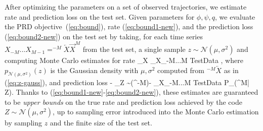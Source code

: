 \documentclass[entropy,article,submit,moreauthors,pdftex,10pt,a4paper]{Definitions/mdpi}
\newcommand{\finitefuture}{\overrightarrow{X}^{M}}
\newcommand{\finitepast}{^{-M}\overleftarrow{X}}%
\let\oldequation\equation
\let\oldendequation\endequation
\renewenvironment{equation}
  {\linenomathNonumbers\oldequation}
  {\oldendequation\endlinenomath}
\begin{document}
After optimizing the parameters on a set of observed trajectories, we estimate rate and prediction loss on the test set.
Given parameters for $\phi, \psi, q$, we evaluate the PRD objective~(\ref{eq:bound}), rate (\ref{eq:bound1-new}), and the prediction loss (\ref{eq:bound2-new}) on the test set by taking, for each time series $X_{-M}...X_{M-1} = \finitepast\finitefuture$ from the test set, a single sample $z  \sim \mathcal{N}(\mu, \sigma^2)$ and computing Monte Carlo estimates for rate
\begin{equation}\label{eq:bound-mc-rate}
_{X}\left[ \operatorname{D_{KL}}\infdivx{P_\phi(Z|\finitepast)}{q(Z)}\right] \approx	{}	\sum_{X_{-M...M} \in TestData}  \log {},
\end{equation}
where $p_{\mathcal{N}(\mu, \sigma^2)}(z)$ is the Gaussian density with $\mu, \sigma^2$ computed from $\finitepast$ as in (\ref{eq:z-gauss}), and prediction loss 
\begin{equation}\label{eq:bound-mc-distortion}
 -	_{Z \sim \phi(\finitepast)}\left[\log P_\psi(\finitefuture | Z)\right] \approx - 	\sum_{X_{-M...M} \in TestData}	\log P_\psi(\finitefuture | Z).
\end{equation}
Thanks to (\ref{eq:bound1-new}-\ref{eq:bound2-new}), these estimates are guaranteed to be \emph{upper bounds} on the true rate and prediction loss achieved by the code $Z  \sim \mathcal{N}(\mu, \sigma^2)$, up to sampling error introduced into the Monte Carlo estimation by sampling $z$ and the finite size of the test set.


\end{document}
